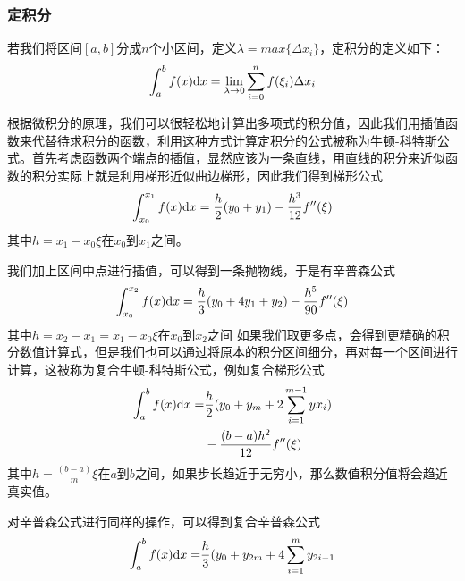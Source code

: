 \documentclass[UTF8,a4paper,10pt]{ctexart}
\begin{document}
\begin{multicols}{2}
            \subsubsection{定积分}
            若我们将区间$[a,b]$分成$n$个小区间，定义$\lambda = max\{\Delta x_i\}$，定积分的定义如下：
            \begin{equation}
                \int_{a}^{b}f(x){\rm d}x = \lim_{\lambda\to 0}\sum_{i=0}^{n}f(\xi_i)\Delta x_i
            \end{equation}\par
            根据微积分的原理，我们可以很轻松地计算出多项式的积分值，因此我们用插值函数来代替待求积分的函数，利用这种方式计算定积分的公式被称为牛顿-科特斯公式。首先考虑函数两个端点的插值，显然应该为一条直线，用直线的积分来近似函数的积分实际上就是利用梯形近似曲边梯形，因此我们得到梯形公式
            \begin{equation}
                \int_{x_0}^{x_1} f(x){\rm d}x = \frac{h}{2}(y_0+y_1)-\frac{h^3}{12}f''(\xi)
            \end{equation}
            其中$h = x_1 - x_0$$\xi$在$x_0$到$x_1$之间。\par
            我们加上区间中点进行插值，可以得到一条抛物线，于是有辛普森公式
            \begin{equation}
                \int_{x_0}^{x_2} f(x){\rm d}x = \frac{h}{3}(y_0+4y_1+y_2)-\frac{h^5}{90}f''(\xi)
            \end{equation}
            其中$h = x_2 - x_1 = x_1 - x_0$$\xi$在$x_0$到$x_2$之间
            如果我们取更多点，会得到更精确的积分数值计算式，但是我们也可以通过将原本的积分区间细分，再对每一个区间进行计算，这被称为复合牛顿-科特斯公式，例如复合梯形公式
            \begin{equation}
                \begin{split}
                    \int_a^b f(x){\rm d}x = &\frac{h}{2}(y_0+y_m+2\sum_{i=1}^{m-1}yx_i)\\
                    &-\frac{(b-a)h^2}{12}f''(\xi)
                \end{split}
            \end{equation}
            其中$h = \frac{(b-a)}{m}$$\xi$在$a$到$b$之间，如果步长趋近于无穷小，那么数值积分值将会趋近真实值。\par
            对辛普森公式进行同样的操作，可以得到复合辛普森公式
            \begin{equation}
                \begin{split}
                    \int_a^b f(x){\rm d}x = &\frac{h}{3}(y_0+y_{2m}+4\sum_{i=1}^{m}y_{2i-1}\\

\end{split}
\end{equation}$$
\end{multicols}
\end{document}
